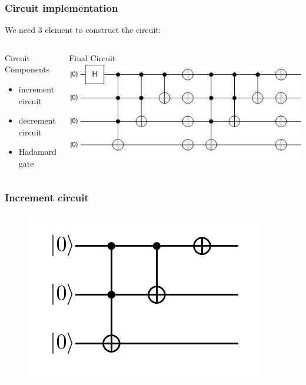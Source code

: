 \documentclass{beamer}
\begin{document}
\begin{frame}
    \frametitle{Circuit implementation}
    We need 3 element to construct the circuit:
    \begin{columns}[T]
        \begin{column}{.5\textwidth}
            \begin{block}{Circuit Components}
                \begin{itemize}
                    \item increment circuit
                    \item decrement circuit
                    \item Hadamard gate
                \end{itemize}
            \end{block}
        \end{column}
        \begin{column}{.5\textwidth}
            \begin{block}{Final Circuit}
                \includegraphics[scale=0.4]{img/cqw.jpg}
            \end{block}
        \end{column}
    \end{columns}   

\end{frame}

\begin{frame}
    \frametitle{Increment circuit}
    \begin{figure}[h!]
        \includegraphics[scale=0.7]{img/increment_circuit.png}
        \centering
    \end{figure}
\end{frame}
\end{document}
